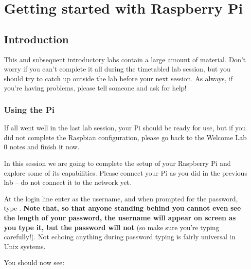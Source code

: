  \chapter{Getting started with Raspberry Pi}

 \minitoc



\section{Introduction}

 This and subsequent introductory labs contain a large amount of material. Don't worry if you can't complete it all during the timetabled lab session, but you should try to catch up outside the lab before your next session. As always, if you're having problems, please tell someone and ask for help!

\subsection{Using the Pi}
\label{sec:using-pi}

If all went well in the last lab session, your Pi should be ready for use, but if you did not complete the Raspbian configuration, please go back to the Welcome Lab 0 notes and finish it now.

In this session we are going to complete the setup of your Raspberry Pi and explore some of its capabilities. Please connect your Pi as you did in the previous lab -- do not connect it to the network yet.

At the login line enter  as the username, and when prompted for the password, type . \textbf{Note that, so that anyone standing behind you cannot even see the length of your password,  the username will appear on screen as you type it, but the password will not} (so make sure you're typing carefully!). Not echoing anything during password typing is fairly universal in Unix systems.

You should now see:



